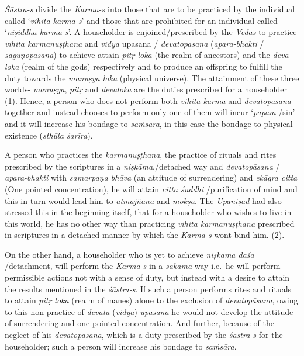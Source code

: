 \emph{Śāstra-s} divide the \emph{Karma-s} into those that are to be practiced by the individual called `\emph{vihita karma-s}' and those that are prohibited for an individual called `\emph{niṣiddha karma-s}'. A householder is enjoined/prescribed by the \emph{Vedas} to practice \emph{vihita karmānuṣṭhāna} and \emph{vidyā} upāsanā / \emph{devatopāsana} (\emph{apara-bhakti} / \emph{saguṇopāsanā}) to achieve attain \emph{pitṛ loka} (the realm of ancestors) and the \emph{deva loka} (realm of the gods) respectively and to produce an offspring to fulfill the duty towards the \emph{manuṣya loka} (physical universe). The attainment of these three worlds- \emph{manuṣya}, \emph{pitṛ} and \emph{devaloka} are the duties prescribed for a householder (1). Hence, a person who does not perform both \emph{vihita karma} and \emph{devatopāsana} together and instead chooses to perform only one of them will incur `\emph{pāpam} /sin' and it will increase his bondage to \emph{saṁsāra}, in this case the bondage to physical existence (\emph{sthūla śarīra}).

A person who practices the \emph{karmānuṣṭhāna}, the practice of rituals and rites prescribed by the scriptures in a \emph{niṣkāma},/detached way and \emph{devatopāsana} / \emph{apara-bhakti} with \emph{samarpaṇa bhāva} (an attitude of surrendering) and \emph{ekāgra citta} (One pointed concentration), he will attain \emph{citta śuddhi} /purification of mind and this in-turn would lead him to \emph{ātmajñāna} and \emph{mokṣa}. The \emph{Upaniṣad} had also stressed this in the beginning itself, that for a householder who wishes to live in this world, he has no other way than practicing \emph{vihita karmānuṣṭhāna} prescribed in scriptures in a detached manner by which the \emph{Karma-s} wont bind him. (2).

On the other hand, a householder who is yet to achieve \emph{niṣkāma daśā} /detachment, will perform the \emph{Karma-s} in a \emph{sakāma} way i.e.\ he will perform permissible actions not with a sense of duty, but instead with a desire to attain the results mentioned in the \emph{śāstra-s}. If such a person performs rites and rituals to attain \emph{pitṛ loka} (realm of manes) alone to the exclusion of \emph{devatopāsana}, owing to this non-practice of \emph{devatā} (\emph{vidyā}) \emph{upāsanā} he would not develop the attitude of surrendering and one-pointed concentration. And further, because of the neglect of his \emph{devatopāsana}, which is a duty prescribed by the \emph{śāstra-s} for the householder; such a person will increase his bondage to \emph{saṁsāra}.
\vskip 2pt

